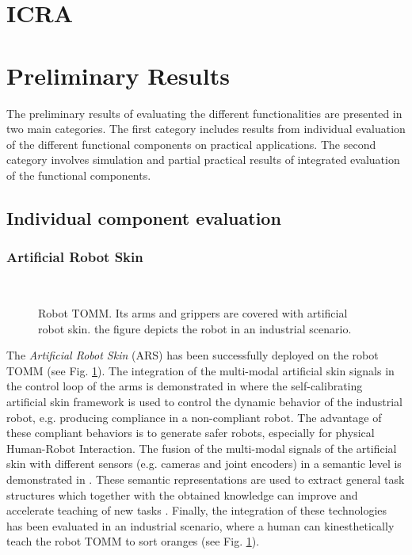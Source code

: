 \section{ICRA}
\section{Preliminary Results}
\label{sec:prelim_results}
The preliminary results of evaluating the different functionalities are presented in two main categories. The first category includes results from individual evaluation of the different functional components on practical applications. The second category involves simulation and partial practical results of integrated evaluation of the functional components.
\subsection{Individual component evaluation}
\subsubsection{Artificial Robot Skin}
\begin{figure}[h]
\centering
{}\\[-10pt]
\caption[]{Robot TOMM. Its arms and grippers are covered with artificial robot skin. the figure depicts the robot in an industrial scenario.}
\label{fig:TommSorting}
\end{figure}

The \textit{Artificial Robot Skin} (ARS) has been successfully deployed on the robot TOMM \cite{Dean-ICRA17} (see Fig. \ref{fig:TommSorting}). The integration of the multi-modal artificial skin signals in the control loop of the arms is demonstrated in \cite{Dean-Humanoids16} where the self-calibrating artificial skin framework is used to control the dynamic behavior of the industrial robot, e.g. producing compliance in a non-compliant robot. The advantage of these compliant behaviors is to generate safer robots, especially for physical Human-Robot Interaction. The fusion of the multi-modal signals of the artificial skin with different sensors (e.g. cameras and joint encoders) in a semantic level is demonstrated in \cite{Ramirez-Amaro-Humanoids16}. These semantic representations are used to extract general task structures which together with the obtained knowledge can improve and accelerate teaching of new tasks \cite{Dynaov-Humanoids16}. Finally, the integration of these technologies has been evaluated in an industrial scenario, where a human can kinesthetically teach the robot TOMM to sort oranges \cite{Dean-IECON16} (see Fig. \ref{fig:TommSorting}).

